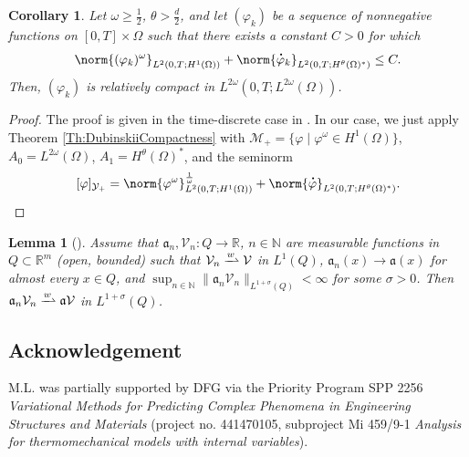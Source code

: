 \documentclass[a4paper,12pt]{article}
\newcommand{\R}{\mathbb{R}}
\newcommand{\N}{\mathbb{N}}
\newcommand\DT[1]{\mathchoice
                 {{\buildrel{\hspace*{.1em}\text{\LARGE.}}\over{#1}}}
                 {{\buildrel{\hspace*{.1em}\text{\Large.}}\over{#1}}}
                 {{\buildrel{\hspace*{.1em}\text{\large.}}\over{#1}}}
                 {{\buildrel{\hspace*{.1em}\text{\large.}}\over{#1}}}}
\renewcommand{\dot}{\DT}
\newcommand{\wto}{\xrightharpoonup{w}}
\theoremstyle{plain}
\newtheorem{Lemma}[Th]{Lemma}
\newtheorem{Cor}[Th]{Corollary}
\theoremstyle{definition}
\numberwithin{equation}{section}
\begin{document}
\begin{Cor}
Let $\omega\geq \frac{1}{2}$, $\theta>\frac{d}{2}$, and let $(\varphi_k)$ be a sequence of nonnegative functions on $[0,T]\times\Omega$ such that there exists a constant $C>0$ for which 
\[
\norm{(\varphi_k)^\omega}_{L^2(0,T;H^1(\Omega))} + \norm{\dot\varphi_k}_{L^2(0,T;H^\theta(\Omega)^*)} \leq C.
\]
Then, $(\varphi_k)$ is relatively compact in $L^{2\omega}(0,T;L^{2\omega}(\Omega))$.
\label{Cor:DubinskiiCompactness}
\end{Cor}   
\begin{proof}
The proof is given in the time-discrete case in \cite{ChJuLi2014NoALDl}. In our case, we just apply Theorem \ref{Th:DubinskiiCompactness} with $\mathcal{M}_+ = \{\varphi \mid \varphi^\omega \in H^1(\Omega)\}$, $A_0 = L^{2\omega}(\Omega)$, $A_1 = H^\theta(\Omega)^*$, and the seminorm 
\[
[\varphi]_{\mathcal{Y}_+} = \norm{\varphi^\omega}^{\frac{1}{\omega}}_{L^2(0,T;H^1(\Omega))} + \norm{\dot\varphi}_{L^2(0,T;H^\theta(\Omega)^*)}.
\]
\end{proof}


\begin{Lemma}[{\cite[Lemma~A.3]{FHKM2022GEAE}}] Assume that $\mathfrak{a}_n, \mathcal{V}_n: Q\to \R$, $n\in\N$ 
are measurable functions in $Q\subset\R^m$ (open, bounded)
such that $\mathcal{V}_n \wto \mathcal{V}$ in $L^1(Q)$, $\mathfrak{a}_n(x) \to \mathfrak{a}(x)$
for almost every $x\in Q$, and $\sup_{n\in\N}\|\mathfrak{a}_n\mathcal{V}_n\|_{L^{1+\sigma}(Q)}<\infty$ for some $\sigma>0$. 
Then $\mathfrak{a}_n\mathcal{V}_n 
\wto \mathfrak{a} \mathcal{V}$ in $L^{1+\sigma}(Q)$.
\label{Lemma:Limitpassage}
\end{Lemma}




\subsection*{Acknowledgement}
M.L. was partially supported by DFG via the Priority Program SPP 2256 \emph{Variational Methods for Predicting Complex
Phenomena in Engineering Structures and Materials} (project no. 441470105, subproject Mi 459/9-1 \emph{Analysis for thermomechanical models with internal variables}).


\printbibliography[]
\end{document}
